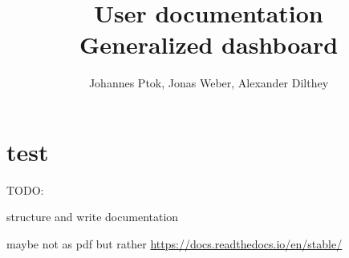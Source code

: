 \documentclass[10pt,a4paper]{article}
\title{User documentation \\ 
	   Generalized dashboard }
\author{Johannes Ptok, Jonas Weber, Alexander Dilthey}
\date{}
\begin{document}
	\maketitle
	
	\tableofcontents
	\newpage
	
	
	
	\section{test}
	
	TODO:
	
	structure and write documentation
	
	maybe not as pdf but rather \url{https://docs.readthedocs.io/en/stable/}
	
	
	
\end{document}
